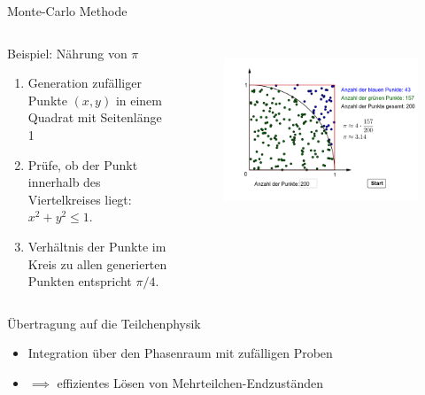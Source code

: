 \documentclass[aspectratio=169,xcolor=dvipsnames]{beamer}
\begin{document}
\begin{frame}{Monte-Carlo Methode}
    \begin{columns}[c]
        \begin{exampleblock}{Beispiel: Nährung von $\pi$}
            \begin{enumerate}
                \item Generation zufälliger Punkte \( (x, y) \) in einem Quadrat mit Seitenlänge 1
                \item Prüfe, ob der Punkt innerhalb des Viertelkreises liegt: \( x^2 + y^2 \leq 1 \).
                \item Verhältnis der Punkte im Kreis zu allen generierten Punkten entspricht \( \pi/4 \).
            \end{enumerate}
        \end{exampleblock}
        \begin{figure}
            \centering
            \includegraphics[width=0.9\linewidth]{figures/montecarlo.png}
            \label{fig:montecarlo}
        \end{figure}
    \end{columns}
    \pause
    \begin{alertblock}{Übertragung auf die Teilchenphysik}
        \begin{itemize}
            \item Integration über den Phasenraum mit zufälligen Proben
            \item $\implies$ effizientes Lösen von Mehrteilchen-Endzuständen
        \end{itemize}
    \end{alertblock}
\end{frame}
\end{document}
